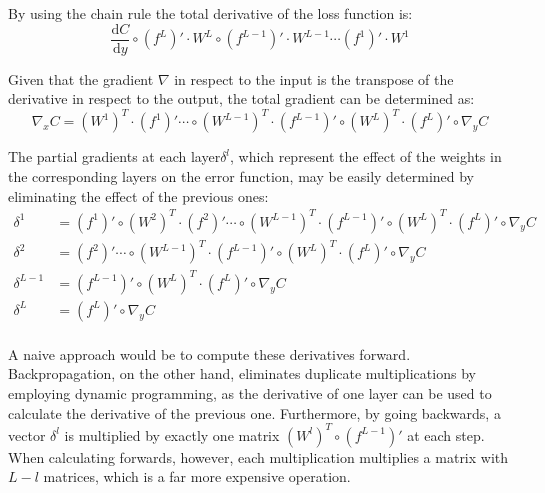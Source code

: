 By using the chain rule the total derivative of the loss function is:
\begin{equation}
    \frac{\mathrm{d}C}{\mathrm{d}y} \circ 
    \left( f^L \right)' \cdot W^L 
    \circ \left( f^{L-1} \right)' \cdot W^{L-1} \cdots 
    \left( f^{1} \right)' \cdot W^{1}
	\label{eqn:Backpropagation, total derivative of the loss function}
\end{equation}

Given that the gradient \(\nabla \) in respect to the input is the transpose of the derivative in respect to the output, the total gradient can be determined as:
\begin{equation}
    \nabla_x C =
        \left( W^{1} \right)^T \cdot \left( f^{1} \right)' \cdots \circ
        \left( W^{L-1} \right)^T \cdot \left( f^{L-1} \right)' \circ
        \left( W^{L} \right)^T \cdot \left( f^{L} \right)' \circ
        \nabla_y C
	\label{eqn:Backpropagation, total gradient}
\end{equation}

The partial gradients at each layer\( \delta^l \), which represent the effect of the weights in the corresponding layers on the error function, may be easily determined by eliminating the effect of the previous ones:
\begin{equation}
    \begin{split} 
        \delta^{1} & = 
            \left( f^{1} \right)' \circ 
            \left( W^{2} \right)^T \cdot \left( f^{2} \right)' \cdots \circ
            \left( W^{L-1} \right)^T \cdot \left( f^{L-1} \right)' \circ
            \left( W^{L} \right)^T \cdot \left( f^{L} \right)' \circ
            \nabla_y C\\
        \delta^{2} & =
            \left( f^{2} \right)' \cdots \circ
            \left( W^{L-1} \right)^T \cdot \left( f^{L-1} \right)' \circ
            \left( W^{L} \right)^T \cdot \left( f^{L} \right)' \circ
            \nabla_y C\\
        \delta^{L-1} & =
            \left( f^{L-1} \right)' \circ
            \left( W^{L} \right)^T \cdot \left( f^{L} \right)' \circ
            \nabla_y C\\
        \delta^{L} & =
            \left( f^{L} \right)' \circ
            \nabla_y C\\
    \end{split}
	\label{eqn:Backpropagation, per layer gradient}
\end{equation}

A naive approach would be to compute these derivatives forward. Backpropagation, on the other hand, eliminates duplicate multiplications by employing dynamic programming, as the derivative of one layer can be used to calculate the derivative of the previous one. Furthermore, by going backwards, a vector \(\delta^l\) is multiplied by exactly one matrix \(\left( W^{l} \right)^T \circ \left( f^{L-1} \right)'\) at each step. When calculating forwards, however, each multiplication multiplies a matrix with \( L-l \) matrices, which is a far more expensive operation.

